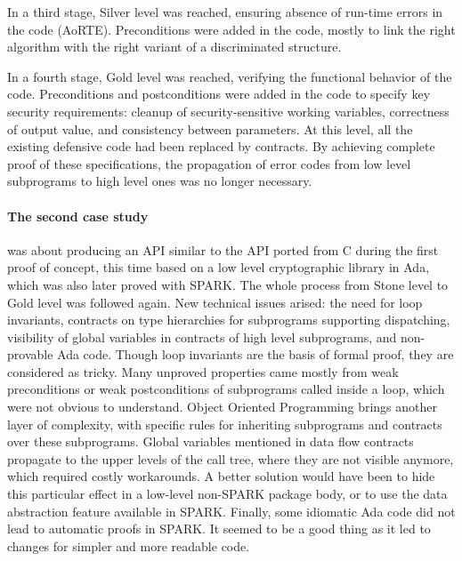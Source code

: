 \documentclass{llncs}
\begin{document}
In a third stage, Silver level was reached, ensuring absence of run-time errors
in the code (AoRTE). Preconditions were added in the code, mostly to link the
right algorithm with the right variant of a discriminated structure.

In a fourth stage, Gold level was reached, verifying the functional behavior of
the code.  Preconditions and postconditions were added in the code to specify key
security requirements: cleanup of security-sensitive working variables,
correctness of output value, and consistency between parameters. At this level, all
the existing defensive code had been replaced by contracts. By achieving
complete proof of these specifications, the propagation of error codes from low
level subprograms to high level ones was no longer necessary.

\paragraph{The second case study} was about producing an API similar to the API ported from C
during the first proof of concept, this time based on a low level cryptographic
library in Ada, which was also later proved with SPARK. The whole process from
Stone level to Gold level was followed again. New technical
issues arised: the need for loop invariants, contracts on type hierarchies for
subprograms supporting dispatching, visibility of global variables in contracts
of high level subprograms, and non-provable Ada code. Though loop invariants are
the basis of formal proof, they are considered as tricky. Many unproved
properties came mostly from weak preconditions or weak postconditions of
subprograms called inside a loop, which were not obvious to understand. Object
Oriented Programming brings another layer of complexity, with specific rules
for inheriting subprograms and contracts over these subprograms. Global
variables mentioned in data flow contracts propagate to the upper levels of the
call tree, where they are not visible anymore, which required costly
workarounds. A better solution would have been to hide this particular effect
in a low-level non-SPARK package body, or to use the data abstraction feature
available in SPARK. Finally, some idiomatic Ada code did not lead to automatic
proofs in SPARK. It seemed to be a good thing as it led to changes for
simpler and more readable code.
\end{document}
